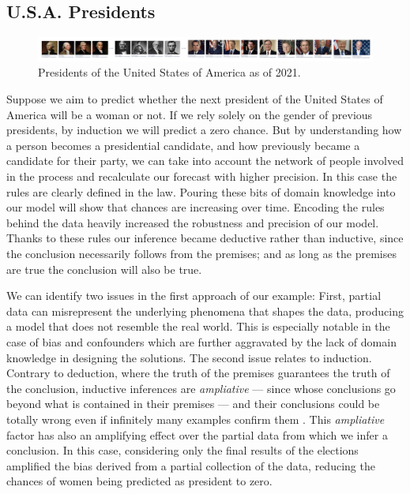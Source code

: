 \documentclass[
]{book}
\begin{document}
\newpage

\hypertarget{u.s.a.-presidents}{%
\subsection{U.S.A. Presidents}\label{u.s.a.-presidents}}

\begin{figure}

{\centering \includegraphics[width=1\linewidth]{Figures/usa_presidents} 

}

\caption{Presidents of the United States of America as of 2021.}\label{fig:us-presidents}
\end{figure}

Suppose we aim to predict whether the next president of the United States of America will be a woman or not. If we rely solely on the gender of previous presidents, by induction we will predict a zero chance. But by understanding how a person becomes a presidential candidate, and how previously became a candidate for their party, we can take into account the network of people involved in the process and recalculate our forecast with higher precision. In this case the rules are clearly defined in the law. Pouring these bits of domain knowledge into our model will show that chances are increasing over time. Encoding the rules behind the data heavily increased the robustness and precision of our model. Thanks to these rules our inference became deductive rather than inductive, since the conclusion necessarily follows from the premises; and as long as the premises are true the conclusion will also be true.

We can identify two issues in the first approach of our example: First, partial data can misrepresent the underlying phenomena that shapes the data, producing a model that does not resemble the real world. This is especially notable in the case of bias and confounders which are further aggravated by the lack of domain knowledge in designing the solutions. The second issue relates to induction. Contrary to deduction, where the truth of the premises guarantees the truth of the conclusion, inductive inferences are \emph{ampliative} --- since whose conclusions go beyond what is contained in their premises --- and their conclusions could be totally wrong even if infinitely many examples confirm them \citep{bergadano1991problem}. This \emph{ampliative} factor has also an amplifying effect over the partial data from which we infer a conclusion. In this case, considering only the final results of the elections amplified the bias derived from a partial collection of the data, reducing the chances of women being predicted as president to zero.
\end{document}
